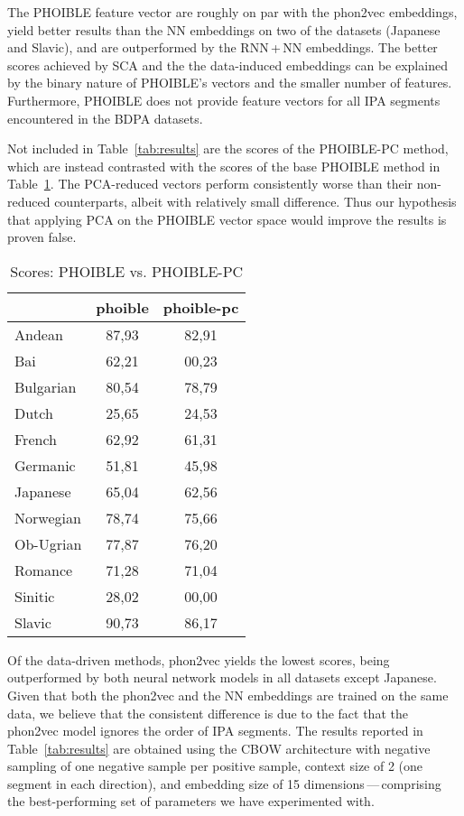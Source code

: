 \documentclass[a4paper]{report}
\begin{document}
The PHOIBLE feature vector are roughly on par with the phon2vec embeddings,
yield better results than the NN embeddings on two of the datasets (Japanese and Slavic), and are outperformed by the RNN\,+\,NN embeddings.
The better scores achieved by SCA and the the data-induced embeddings can be explained by the binary nature of PHOIBLE's vectors and the smaller number of features.
Furthermore, PHOIBLE does not provide feature vectors for all IPA segments encountered in the BDPA datasets.

Not included in Table~\ref{tab:results} are the scores of the PHOIBLE-PC method,
which are instead contrasted with the scores of the base PHOIBLE method in Table~\ref{tab:results-phoible}.
The PCA-reduced vectors perform consistently worse than their non-reduced counterparts, albeit with relatively small difference.
Thus our hypothesis that applying PCA on the PHOIBLE vector space would improve the results is proven false.

\begin{table}[h]
	\centering\small
	\begin{tabular}{l *{2}{c}}
		\toprule
		& phoible & phoible-pc \\
		\midrule
		Andean		&	87,93 &	82,91 \\
		Bai			&	62,21 &	00,23 \\
		Bulgarian	&	80,54 &	78,79 \\
		Dutch		&	25,65 &	24,53 \\
		French		&	62,92 &	61,31 \\
		Germanic	&	51,81 &	45,98 \\
		Japanese	&	65,04 &	62,56 \\
		Norwegian	&	78,74 &	75,66 \\
		Ob-Ugrian	&	77,87 &	76,20 \\
		Romance		&	71,28 &	71,04 \\
		Sinitic		&	28,02 &	00,00 \\
		Slavic		&	90,73 &	86,17 \\
		\bottomrule
	\end{tabular}
	\caption{Scores: PHOIBLE vs. PHOIBLE-PC}
	\label{tab:results-phoible}
\end{table}

Of the data-driven methods, phon2vec yields the lowest scores, being outperformed by both neural network models in all datasets except Japanese.
Given that both the phon2vec and the NN embeddings are trained on the same data,
we believe that the consistent difference is due to the fact that the phon2vec model ignores the order of IPA segments.
The results reported in Table~\ref{tab:results} are obtained using the CBOW architecture
with negative sampling of one negative sample per positive sample, context size of 2 (one segment in each direction),
and embedding size of 15 dimensions\,---\,comprising the best-performing set of parameters we have experimented with.
\end{document}
